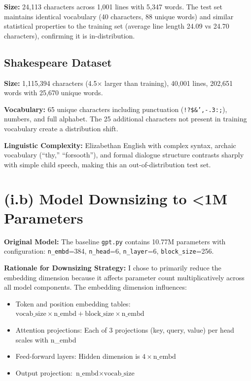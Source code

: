 \documentclass[11pt]{article}
\begin{document}
\textbf{Size:} 24,113 characters across 1,001 lines with 5,347 words. The test set maintains identical vocabulary (40 characters, 88 unique words) and similar statistical properties to the training set (average line length 24.09 vs 24.70 characters), confirming it is in-distribution.

\subsection*{Shakespeare Dataset}

\textbf{Size:} 1,115,394 characters (4.5× larger than training), 40,001 lines, 202,651 words with 25,670 unique words.

\textbf{Vocabulary:} 65 unique characters including punctuation (\texttt{!?\$\&',-.3:;}), numbers, and full alphabet. The 25 additional characters not present in training vocabulary create a distribution shift.

\textbf{Linguistic Complexity:} Elizabethan English with complex syntax, archaic vocabulary (``thy,'' ``forsooth''), and formal dialogue structure contrasts sharply with simple child speech, making this an out-of-distribution test set.

\section*{(i.b) Model Downsizing to <1M Parameters}

\textbf{Original Model:} The baseline \texttt{gpt.py} contains 10.77M parameters with configuration: \texttt{n\_embd}=384, \texttt{n\_head}=6, \texttt{n\_layer}=6, \texttt{block\_size}=256.

\textbf{Rationale for Downsizing Strategy:} I chose to primarily reduce the embedding dimension because it affects parameter count multiplicatively across all model components. The embedding dimension influences:
\begin{itemize}
    \item Token and position embedding tables: $\text{vocab\_size} \times \text{n\_embd} + \text{block\_size} \times \text{n\_embd}$
    \item Attention projections: Each of 3 projections (key, query, value) per head scales with n\_embd
    \item Feed-forward layers: Hidden dimension is $4 \times \text{n\_embd}$
    \item Output projection: $\text{n\_embd} \times \text{vocab\_size}$
\end{itemize}
\end{document}

